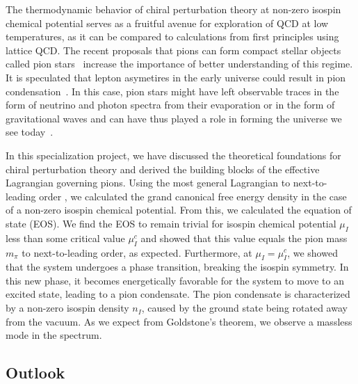The thermodynamic behavior of chiral perturbation theory at non-zero isospin chemical potential serves as a fruitful avenue for exploration of QCD at low temperatures, as it can be compared to calculations from first principles using lattice QCD.
The recent proposals that pions can form compact stellar objects called pion stars~\cite{new_clas_of_compact_stars,andersen:bose_einstein} increase the importance of better understanding of this regime.
It is speculated that lepton asymetires in the early universe could result in pion condensation~\cite{new_clas_of_compact_stars,abduki:Pion_condensation_in_a_dense_neutrino_gas,Wygas:Cosmic_QCD_Epoch_at_Nonvanishing_Lepton_Asymmetry,Schwarz_2009:Lepton_asymmetry_and_the_cosmic_QCD_transition}.
In this case, pion stars might have left observable traces in the form of neutrino and photon spectra from their evaporation or in the form of gravitational waves and can have thus played a role in forming the universe we see today~\cite{new_clas_of_compact_stars}.

In this specialization project, we have discussed the theoretical foundations for chiral perturbation theory and derived the building blocks of the effective Lagrangian governing pions.
Using the most general Lagrangian to next-to-leading order , we calculated the grand canonical free energy density in the case of a non-zero isospin chemical potential.
From this, we calculated the equation of state (EOS).
We find the EOS to remain trivial for isospin chemical potential $\mu_I$ less than some critical value $\mu_I^c$ and showed that this value equals the pion mass $m_\pi$ to next-to-leading order, as expected.
Furthermore, at $\mu_I = \mu_I^c$, we showed that the system undergoes a phase transition, breaking the isospin symmetry.
In this new phase, it becomes energetically favorable for the system to move to an excited state, leading to a pion condensate.
The pion condensate is characterized by a non-zero isospin density $n_I$, caused by the ground state being rotated away from the vacuum.
As we expect from Goldstone's theorem, we observe a massless mode in the spectrum.


\subsection*{Outlook}

